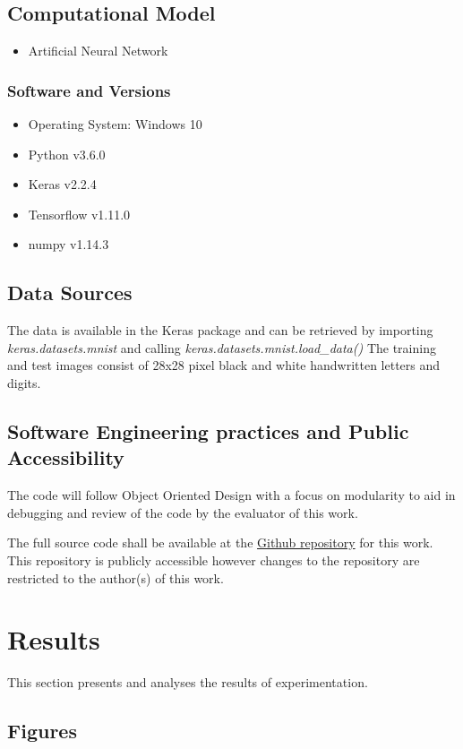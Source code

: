 \documentclass{article}
\begin{document}
\subsection{Computational Model}
\begin{itemize}
	\item Artificial Neural Network
	
\end{itemize}
\subsubsection{Software and Versions}
\begin{itemize}
	\item Operating System: Windows 10
	\item Python v3.6.0
	\item Keras v2.2.4
	\item Tensorflow v1.11.0
	\item numpy v1.14.3
\end{itemize}

\subsection{Data Sources}
The data is available in the Keras package and can be retrieved by importing \textit{keras.datasets.mnist} and calling \textit{keras.datasets.mnist.load\_data()}
The training and test images consist of 28x28 pixel black and white handwritten letters and digits.

\subsection{Software Engineering practices and Public Accessibility}
The code will follow Object Oriented Design with a focus on modularity to aid in debugging and review of the code by the evaluator of this work. 

The full source code shall be available at the \href{https://github.com/KenanKarav/CapstoneProject.git}{Github repository} for this work. This repository is publicly accessible however changes to the repository are restricted to the author(s) of this work.

\section{Results}
This section presents and analyses the results of experimentation.

\subsection{Figures}
\end{document}

